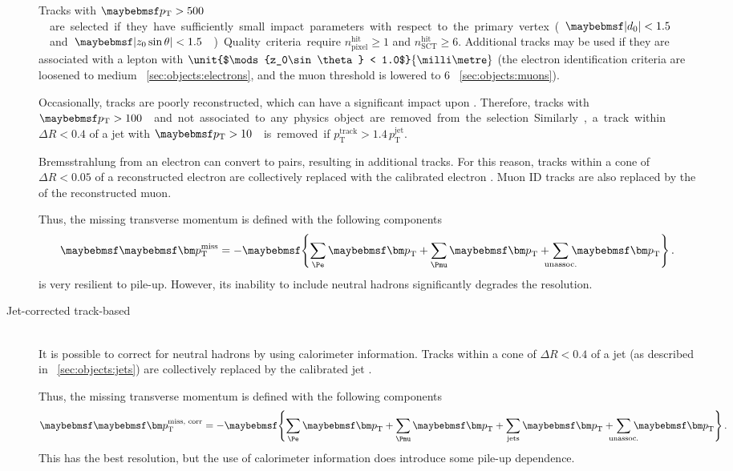 \begin{description}
	Tracks with \unit{$\pt > 500$}{\MeV} are selected if they have sufficiently small 
	impact parameters with respect to the primary vertex 
	(\unit{$\mods{d_0} < 1.5$}{\milli\metre} and 
	\unit{$\mods{z_0\sin\theta} < 1.5$}{\milli\metre}). Quality criteria require 
	$n_{\text{pixel}}^{\text{hit}} \geq 1$ and $n_{\text{SCT}}^{\text{hit}} \geq 6$. 
	Additional tracks may be used if they are associated with a lepton with 
	$\unit{$\mods{z_0\sin\theta} < 1.0$}{\milli\metre}$ (the electron identification 
	criteria are loosened to medium \cf \Section~\ref{sec:objects:electrons}, and the 
	muon \pt threshold is lowered to \unit{6}{\GeV} \cf \Section~\ref{sec:objects:muons}).

	Occasionally, tracks are poorly reconstructed, which can have a significant impact 
	upon \trackmet. Therefore, tracks with \unit{$\pt > 100$}{\GeV} and not associated to 
	any physics object are removed from the selection. Similarly, a track within 
	$\Delta R < 0.4$ of a jet with \unit{$\pt > 10$}{\GeV} is removed if 
	$p_{\text{T}}^{\text{track}} > 1.4 \, p_{\text{T}}^{\text{jet}}$.

	Bremsstrahlung from an electron can convert to \epluseminus pairs, resulting in 
	additional tracks. For this reason, tracks within a cone of $\Delta R < 0.05$ of a 
	reconstructed electron are collectively replaced with the calibrated electron \pt.
	Muon \ac{ID} tracks are also replaced by the \pt of the reconstructed muon.

	Thus, the missing transverse momentum is defined with the following components
	\begin{equation}
		\trackmetvec = - \braces{ 
		\sum\limits_{\Pe} \bvec{p}_{\text{T}} + 
		\sum\limits_{\Pmu} \bvec{p}_{\text{T}} + 
		\!\!\!\! \sum\limits_{\text{unassoc.}} \!\!\!\! \bvec{p}_{\text{T}}
		} \,.
	\end{equation}
	\trackmet is very resilient to pile-up. However, its inability to include neutral 
	hadrons significantly degrades the resolution.

\item[Jet-corrected track-based \corrtrackmet] \hfill \\
	It is possible to correct \trackmet for neutral hadrons by using calorimeter 
	information. Tracks within a cone of $\Delta R < 0.4$ of a jet (as described in 
	\Section~\ref{sec:objects:jets}) are collectively replaced by the calibrated jet \pt.

	Thus, the missing transverse momentum is defined with the following components
	\begin{equation}
		\corrtrackmetvec = - \braces{ 
		\sum\limits_{\Pe} \bvec{p}_{\text{T}} + 
		\sum\limits_{\Pmu} \bvec{p}_{\text{T}} + 
		\sum\limits_{\text{jets}} \bvec{p}_{\text{T}} + 
		\!\!\!\! \sum\limits_{\text{unassoc.}} \!\!\!\! \bvec{p}_{\text{T}}
		} \,.
	\end{equation}
	This has the best resolution, but the use of calorimeter information does introduce 
	some pile-up dependence.


\end{description}
